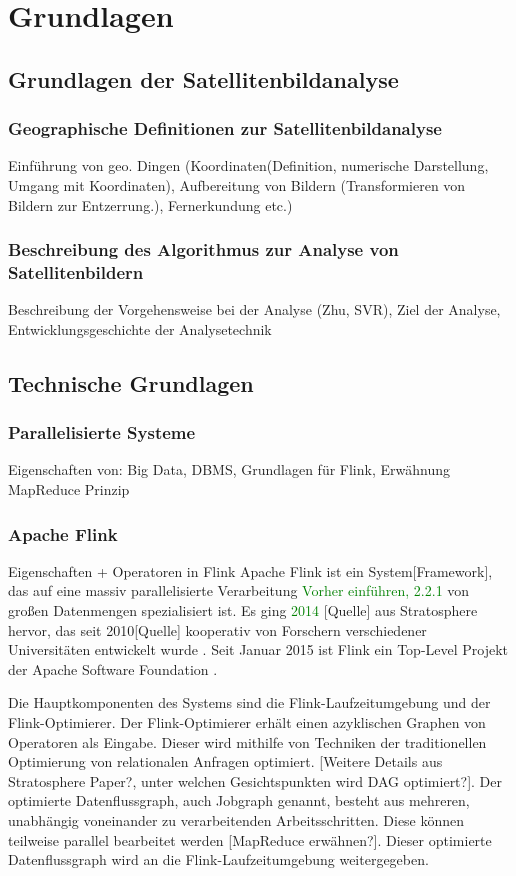 \chapter{Grundlagen}
\section[Grundlagen zur Satellitenbildanalyse]{Grundlagen der Satellitenbildanalyse}
\subsection{Geographische Definitionen zur Satellitenbildanalyse}
Einführung von geo. Dingen (Koordinaten(Definition, numerische Darstellung, Umgang mit Koordinaten), Aufbereitung von Bildern (Transformieren von Bildern zur Entzerrung.), Fernerkundung etc.)
\subsection[Beschreibung des Algorithmus]{Beschreibung des Algorithmus zur Analyse von Satellitenbildern}
Beschreibung der Vorgehensweise bei der Analyse (Zhu, SVR), Ziel der Analyse, Entwicklungsgeschichte der Analysetechnik

\section{Technische Grundlagen}
\subsection{Parallelisierte Systeme}
Eigenschaften von: Big Data, DBMS, Grundlagen für Flink, Erwähnung MapReduce Prinzip
\subsection{Apache Flink}
Eigenschaften + Operatoren in Flink
\newline
Apache Flink ist ein System[Framework], das auf eine massiv parallelisierte Verarbeitung \textcolor{green}{Vorher einführen, 2.2.1} von großen Datenmengen spezialisiert ist. Es ging \textcolor{green}{2014} [Quelle] aus Stratosphere hervor, das seit 2010[Quelle] kooperativ von Forschern verschiedener Universitäten entwickelt wurde \cite{Alexandrov2014}. Seit Januar 2015 ist Flink ein Top-Level Projekt der Apache Software Foundation \cite{ApacheFlinkBlogEntry}. 

Die Hauptkomponenten des Systems sind die Flink-Laufzeitumgebung und der Flink-Optimierer. Der Flink-Optimierer erhält einen azyklischen Graphen von Operatoren als Eingabe. Dieser wird mithilfe von Techniken der traditionellen Optimierung von relationalen Anfragen optimiert. [Weitere Details aus Stratosphere Paper?, unter welchen Gesichtspunkten wird DAG optimiert?]. Der optimierte Datenflussgraph, auch Jobgraph genannt, besteht aus mehreren, unabhängig voneinander zu verarbeitenden Arbeitsschritten. Diese können teilweise parallel bearbeitet werden [MapReduce erwähnen?]. Dieser optimierte Datenflussgraph wird an die Flink-Laufzeitumgebung weitergegeben. 

